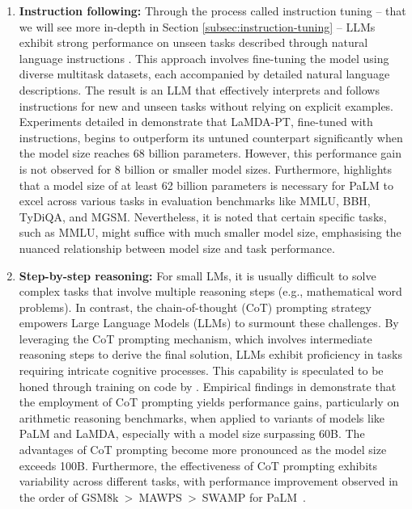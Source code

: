 \begin{enumerate}
{\begin{enumerate}
{\begin{quote}
					            \textit{Output:} {\enquote{Le renard brun rapide saute par-dessus le chien paresseux.}}\\
					            \textbf{Arithmetic Tasks:} \\
					            \textit{Input:} {\enquote{What is the sum of 42 and 63?}} \\
					            \textit{Output:} {\enquote{The sum of 42 and 63 is 105.}}
				            \end{quote}
			            }
			      \item \textbf{Instruction following:}{
				            Through the process called instruction tuning -- that we will see more in-depth in Section  \ref{subsec:instruction-tuning} -- LLMs exhibit strong performance on unseen tasks described through natural language instructions \cite{sanhetal2022multitask, ouyang2022training, wei2022fine}.
				            This approach involves fine-tuning the model using diverse multitask datasets, each accompanied by detailed natural language descriptions. The result is an LLM that effectively interprets and follows instructions for new and unseen tasks without relying on explicit examples.
				            Experiments detailed in \textcite{wei2022fine} demonstrate that LaMDA-PT, fine-tuned with instructions, begins to outperform its untuned counterpart significantly when the model size reaches 68 billion parameters. However, this performance gain is not observed for 8 billion or smaller model sizes. Furthermore, \textcite{chung2022scaling} highlights that a model size of at least 62 billion parameters is necessary for PaLM to excel across various tasks in evaluation benchmarks like MMLU, BBH, TyDiQA, and MGSM. Nevertheless, it is noted that certain specific tasks, such as MMLU, might suffice with much smaller model size, emphasising the nuanced relationship between model size and task performance.
			            }
			      \item \textbf{Step-by-step reasoning:} { For small LMs, it is usually difficult to solve complex tasks that involve multiple reasoning steps (e.g., mathematical word problems).
				            In contrast, the chain-of-thought (CoT) prompting strategy \cite{wei2022chain} empowers Large Language Models (LLMs) to surmount these challenges. By leveraging the CoT prompting mechanism, which involves intermediate reasoning steps to derive the final solution, LLMs exhibit proficiency in tasks requiring intricate cognitive processes. This capability is speculated to be honed through training on code by \textcite{wei2022chain}. Empirical findings in \textcite{wei2022chain} demonstrate that the employment of CoT prompting yields performance gains, particularly on arithmetic reasoning benchmarks, when applied to variants of models like PaLM and LaMDA, especially with a model size surpassing 60B. The advantages of CoT prompting become more pronounced as the model size exceeds 100B. Furthermore, the effectiveness of CoT prompting exhibits variability across different tasks, with performance improvement observed in the order of GSM8k~\textgreater~MAWPS~\textgreater~SWAMP for PaLM~\cite{wei2022chain}.
			            }
		      \end{enumerate}
	      }
\end{enumerate}
